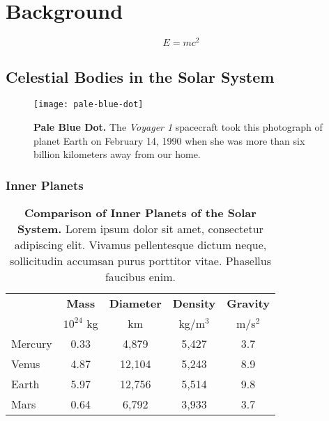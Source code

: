 
\chapter{Background}

\lipsum[1]

\begin{equation}
    E = mc^2
\end{equation}

\lipsum[2]

\section{Celestial Bodies in the Solar System}

\lipsum[3]

\begin{figure}[ht]
	\texttt{[image: pale-blue-dot]}
	\caption[Pale Blue Dot]{{\bf Pale Blue Dot.} The \emph{Voyager 1} spacecraft took this photograph of planet Earth on February 14, 1990 when she was more than six billion kilometers away from our home.}
\end{figure}

\subsection{Inner Planets}

\lipsum[4]

\begin{table}[ht]
    \begin{tabular}{lcccc}
        \toprule
                & \textbf{Mass} & \textbf{Diameter} & \textbf{Density}  & \textbf{Gravity} \\
                & $10^{24}$ kg  & km                & kg/m$^3$          & m/s$^2$ \\
        \midrule
        Mercury & 0.33          & 4,879             & 5,427             & 3.7 \\
        Venus   & 4.87          & 12,104            & 5,243             & 8.9 \\
        Earth   & 5.97          & 12,756            & 5,514             & 9.8 \\
        Mars    & 0.64          & 6,792             & 3,933             & 3.7 \\
        \bottomrule
    \end{tabular}
    \caption[Comparison of Inner Planets of the Solar System]{{\bf Comparison of Inner Planets of the Solar System.} Lorem ipsum dolor sit amet, consectetur adipiscing elit. Vivamus pellentesque dictum neque, sollicitudin accumsan purus porttitor vitae. Phasellus faucibus enim.}
\end{table}

